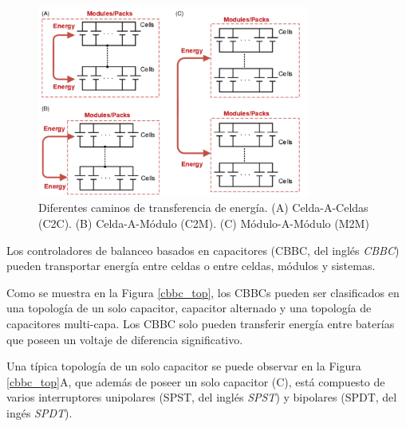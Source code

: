 \documentclass[10pt,a4paper]{article}
\newcounter{subsubsubsection}[subsubsection]
\begin{document}
\begin{figure}[h!]
    \begin{center}
        \includegraphics[width=0.8\textwidth]{energy_transfer.png}
        \caption{Diferentes caminos de transferencia de energ\'ia. (A)
        Celda-A-Celdas (\acrshort{C2C}). (B) Celda-A-M\'odulo (\acrshort{C2M}).
        (C) M\'odulo-A-M\'odulo (\acrshort{M2M})} 
        \label{energy_transfer}
    \end{center}
\end{figure}


Los controladores de balanceo basados en capacitores (\acrshort{CBBC}, del
ingl\'es \emph{\acrlong{CBBC}}) pueden transportar energ\'ia entre celdas o
entre celdas, m\'odulos y sistemas.

Como se muestra en la Figura \ref{cbbc_top}, los \acrshort{CBBC}s pueden ser 
clasificados en una topolog\'ia de un solo capacitor, capacitor alternado y una 
topolog\'ia de capacitores multi-capa. Los \acrshort{CBBC} solo pueden 
transferir energ\'ia entre bater\'ias que poseen un voltaje de diferencia 
significativo.

Una t\'ipica topolog\'ia de un solo capacitor se puede observar en la Figura
\ref{cbbc_top}A, que adem\'as de poseer un solo capacitor (C), est\'a compuesto
de varios interruptores unipolares (\acrshort{SPST}, del ingl\'es 
\emph{\acrlong{SPST}}) y bipolares (\acrshort{SPDT}, del ing\'es 
\emph{\acrlong{SPDT}}). 
\end{document}
